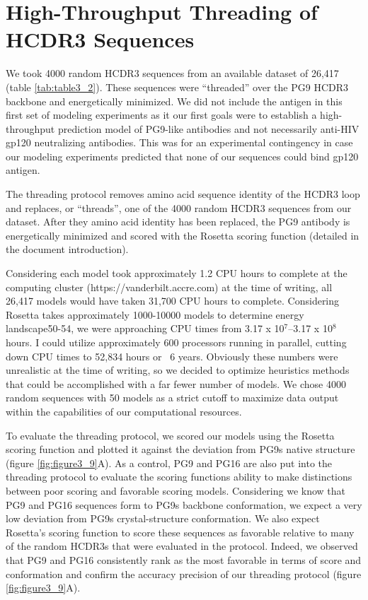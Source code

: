 \section{High-Throughput Threading of HCDR3 Sequences}
We took 4000 random HCDR3 sequences from an available dataset of 26,417 (table \ref{tab:table3_2}). These sequences were “threaded” over the PG9 HCDR3 backbone and energetically minimized. We did not include the antigen in this first set of modeling experiments as it our first goals were to establish a high-throughput prediction model of PG9-like antibodies and not necessarily anti-HIV gp120 neutralizing antibodies. This was for an experimental contingency in case our modeling experiments predicted that none of our sequences could bind gp120 antigen.

The threading protocol removes amino acid sequence identity of the HCDR3 loop and replaces, or “threads”, one of the 4000 random HCDR3 sequences from our dataset. After they amino acid identity has been replaced, the PG9 antibody is energetically minimized and scored with the Rosetta scoring function (detailed in the document introduction).

Considering each model took approximately 1.2 CPU hours to complete at the computing cluster (https://vanderbilt.accre.com) at the time of writing, all 26,417 models would have taken 31,700 CPU hours to complete. Considering Rosetta takes approximately 1000-10000 models to determine energy landscape50-54, we were approaching CPU times from 3.17 x 10$^{7}$–3.17 x 10$^{8}$ hours. I could utilize approximately 600 processors running in parallel, cutting down CPU times to 52,834 hours or ~6 years. Obviously these numbers were unrealistic at the time of writing, so we decided to optimize heuristics methods that could be accomplished with a far fewer number of models. We chose 4000 random sequences with 50 models as a strict cutoff to maximize data output within the capabilities of our computational resources.

To evaluate the threading protocol, we scored our models using the Rosetta scoring function and plotted it against the deviation from PG9s native structure (figure \ref{fig:figure3_9}A). As a control, PG9 and PG16 are also put into the threading protocol to evaluate the scoring functions ability to make distinctions between poor scoring and favorable scoring models. Considering we know that PG9 and PG16 sequences form to PG9s backbone conformation, we expect a very low deviation from PG9s crystal-structure conformation. We also expect Rosetta’s scoring function to score these sequences as favorable relative to many of the random HCDR3s that were evaluated in the protocol. Indeed, we observed that PG9 and PG16 consistently rank as the most favorable in terms of score and conformation and confirm the accuracy precision of our threading protocol (figure \ref{fig:figure3_9}A).

